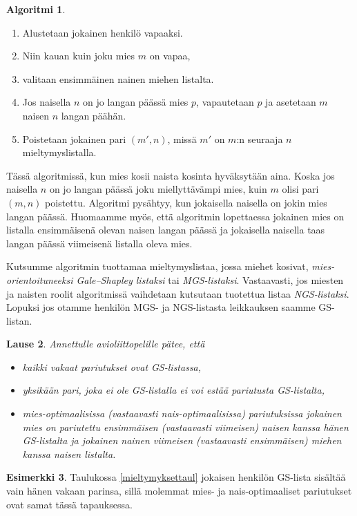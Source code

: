 \documentclass[finnish]{tktltiki2}
\newtheorem{lau}{Lause}
\theoremstyle{definition}
\newtheorem{alg}[lau]{Algoritmi}
\newtheorem{esim}[lau]{Esimerkki}
\theoremstyle{remark}
\begin{document}
\begin{alg}\cite[s. 16]{gusfield1989stable}\label{alg2}
	\begin{enumerate}
		\item Alustetaan jokainen henkilö vapaaksi.
		\item Niin kauan kuin joku mies $m$ on vapaa,
		\item valitaan ensimmäinen nainen miehen listalta.
		\item Jos naisella $n$ on jo langan päässä mies $p$, vapautetaan $p$ ja asetetaan $m$ naisen $n$ langan päähän.
		\item Poistetaan jokainen pari $(m', n)$, missä $m'$ on $m$:n seuraaja $n$ mieltymyslistalla.
	\end{enumerate}
\end{alg}

Tässä algoritmissä, kun mies kosii naista kosinta hyväksytään aina. Koska jos naisella $n$ on jo langan päässä joku miellyttävämpi mies, kuin $m$ olisi pari $(m, n)$ poistettu.
Algoritmi pysähtyy, kun jokaisella naisella on jokin mies langan päässä. Huomaamme myös, että algoritmin lopettaessa jokainen mies on listalla ensimmäisenä olevan naisen langan päässä ja jokaisella naisella taas langan päässä viimeisenä listalla oleva mies.

Kutsumme algoritmin tuottamaa mieltymyslistaa, jossa miehet kosivat, \emph{mies-orientoituneeksi Gale--Shapley listaksi} tai \emph{MGS-listaksi}. Vastaavasti, jos miesten ja naisten roolit algoritmissä vaihdetaan kutsutaan tuotettua listaa \emph{NGS-listaksi}. Lopuksi jos otamme henkilön MGS- ja NGS-listasta leikkauksen saamme GS-listan.

\begin{lau}\cite[s. 17]{gusfield1989stable}\label{laajlause}
	Annettulle avioliittopelille pätee, että
	\begin{itemize}
		\item kaikki vakaat pariutukset ovat GS-listassa,
		\item yksikään pari, joka ei ole GS-listalla ei voi estää pariutusta GS-listalta,
		\item mies-optimaalisissa (vastaavasti nais-optimaalisissa) pariutuksissa jokainen mies on pariutettu ensimmäisen (vastaavasti viimeisen) naisen kanssa hänen GS-listalta ja jokainen nainen viimeisen (vastaavasti ensimmäisen) miehen kanssa naisen listalta.
	\end{itemize}
\end{lau}

\begin{esim}
	Taulukossa \ref{mieltymyksettaul} jokaisen henkilön GS-lista sisältää vain hänen vakaan parinsa, sillä molemmat mies- ja nais-optimaaliset pariutukset ovat samat tässä tapauksessa.
\end{esim}
\end{document}
